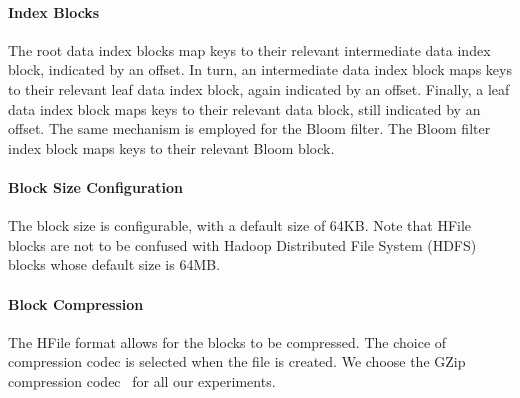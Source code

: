 \paragraph{Index Blocks} The root data index blocks map keys to their
relevant intermediate data index block, indicated by
an offset. In turn, an intermediate data index block
maps keys to their relevant leaf data index block, again indicated by an offset.
Finally, a leaf data index block maps keys to their relevant data block,
still indicated by an offset. The same mechanism is employed for the Bloom filter.
The Bloom filter index block maps keys to their relevant Bloom block.

\paragraph{Block Size Configuration} The block size is
configurable, with a default size of 64KB. Note that HFile blocks are not to be
confused with Hadoop Distributed File System (HDFS) blocks whose default size is
64MB.

\paragraph{Block Compression} The HFile format allows for
the blocks to be compressed. The choice of compression codec is selected when
the file is created. We choose the GZip compression
codec~\citep{Deutsch:1996:ZCD:RFC1950} for all our %
experiments.

